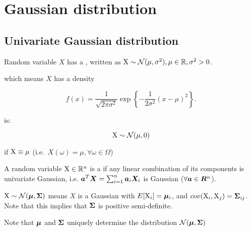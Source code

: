 \chapter{Gaussian distribution}


\section{Univariate Gaussian distribution}

\begin{defn}
    Random variable $X$ has a , written as ${\textnormal{X}} \sim {\mathcal{N}}(\mu, \sigma^2), \mu \in {\mathbb{R}}, \sigma^2 > 0$.
    
    which means $X$ has a density
    
    \begin{equation}
        f(x) = \frac{1}{\sqrt{2 \pi \sigma^2}} \exp{ \left\{ -\frac{1}{2\sigma^2} (x - \mu)^2 \right\}}.
    \end{equation}
\end{defn}

\begin{defn}
     is:
    
    \begin{equation}
        {\textnormal{X}} \sim {\mathcal{N}}(\mu, 0)
    \end{equation}
    
    if ${\textnormal{X}} \equiv \mu$ (i.e.\ $X(\omega) = \mu, \forall \omega \in \Omega$)
\end{defn}

\begin{defn}
    A random variable ${\textnormal{X}} \in {\mathbb{R}}^n$ is a  if any linear combination of its components is univariate Gaussian, i.e. ${\bm{a}}^T {\bm{X}} = \sum_{i=1}^n {\bm{a}}_i {\bm{X}}_i$ is Gaussian ($\forall {\bm{a}} \in {\bm{R}}^n$).
    
\end{defn}

\begin{defn}
    ${\textnormal{X}} \sim {\mathcal{N}}({\bm{\mu}}, {\bm{\Sigma}})$ means $X$ is a Gaussian with $E[{\textnormal{X}}_i] = {\bm{\mu}}_i$, and $cov({\textnormal{X}}_i, {\textnormal{X}}_j) = {\bm{\Sigma}}_{ij}$. Note that this implies that ${\bm{\Sigma}}$ is positive semi-definite.
\end{defn}

\begin{rem}
    Note that ${\bm{\mu}}$ and ${\bm{\Sigma}}$ uniquely determine the distribution ${\mathcal{N}}({\bm{\mu}}, {\bm{\Sigma}})$
\end{rem}

